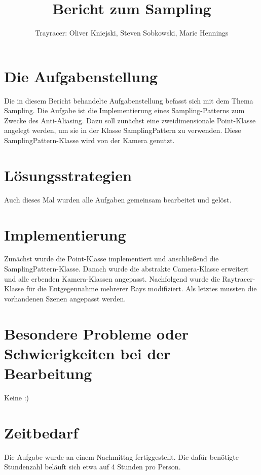 \documentclass[a4paper,parskip=half,11pt]{scrartcl}
\author{Trayracer: Oliver Kniejski, Steven Sobkowski, Marie Hennings}
\title{Bericht zum Sampling}
\begin{document}
 
\maketitle

\section*{Die Aufgabenstellung}

Die in diesem Bericht behandelte Aufgabenstellung befasst sich mit dem Thema Sampling.
Die Aufgabe ist die Implementierung eines Sampling-Patterns zum Zwecke des Anti-Aliasing.
Dazu soll zunächst eine zweidimensionale Point-Klasse angelegt werden, um sie in der Klasse SamplingPattern zu verwenden.
Diese SamplingPattern-Klasse wird von der Kamera genutzt. 

\section*{Lösungsstrategien}
Auch dieses Mal wurden alle Aufgaben gemeinsam bearbeitet und gelöst.

\section*{Implementierung}
Zunächst wurde die Point-Klasse implementiert und anschließend die SamplingPattern-Klasse.
Danach wurde die abstrakte Camera-Klasse erweitert und alle erbenden Kamera-Klassen angepasst.
Nachfolgend wurde die Raytracer-Klasse für die Entgegennahme mehrerer Rays modifiziert.
Als letztes mussten die vorhandenen Szenen angepasst werden.

\section*{Besondere Probleme oder Schwierigkeiten bei der Bearbeitung}
Keine :)

\section*{Zeitbedarf}
Die Aufgabe wurde an einem Nachmittag fertiggestellt.
Die dafür benötigte Stundenzahl beläuft sich etwa auf 4 Stunden pro Person.
\end{document}
